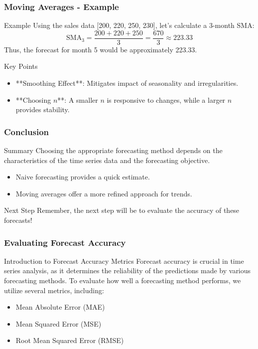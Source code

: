 \documentclass[aspectratio=169]{beamer}
\begin{document}
\begin{frame}[fragile]
    \frametitle{Moving Averages - Example}
    \begin{block}{Example}
        Using the sales data [200, 220, 250, 230], let's calculate a 3-month SMA:
        \begin{equation}
        \text{SMA}_3 = \frac{200 + 220 + 250}{3} = \frac{670}{3} \approx 223.33
        \end{equation}
        Thus, the forecast for month 5 would be approximately 223.33.
    \end{block}

    \begin{block}{Key Points}
        \begin{itemize}
            \item **Smoothing Effect**: Mitigates impact of seasonality and irregularities.
            \item **Choosing \( n \)**: A smaller \( n \) is responsive to changes, while a larger \( n \) provides stability.
        \end{itemize}
    \end{block}
\end{frame}

\begin{frame}[fragile]
    \frametitle{Conclusion}
    \begin{block}{Summary}
        Choosing the appropriate forecasting method depends on the characteristics of the time series data and the forecasting objective.
        \begin{itemize}
            \item Naive forecasting provides a quick estimate.
            \item Moving averages offer a more refined approach for trends.
        \end{itemize}
    \end{block}
    \begin{block}{Next Step}
        Remember, the next step will be to evaluate the accuracy of these forecasts!
    \end{block}
\end{frame}

\begin{frame}[fragile]
    \frametitle{Evaluating Forecast Accuracy}
    \begin{block}{Introduction to Forecast Accuracy Metrics}
        Forecast accuracy is crucial in time series analysis, as it determines the reliability of the predictions made by various forecasting methods. To evaluate how well a forecasting method performs, we utilize several metrics, including:
        \begin{itemize}
            \item Mean Absolute Error (MAE)
            \item Mean Squared Error (MSE)
            \item Root Mean Squared Error (RMSE)
        \end{itemize}
    \end{block}
\end{frame}
\end{document}
